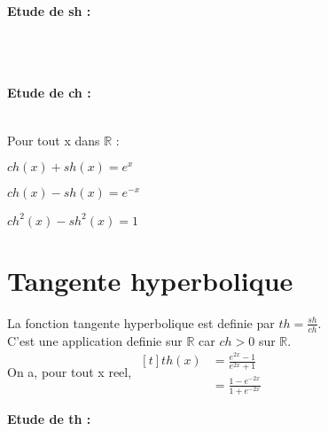\documentclass[12pt,twoside,a4paper]{article}
\begin{document}
			\textbf{Etude de sh :}\\ \ \\
			\\ \ \\
			\textbf{Etude de ch :}\\ \ \\
			\begin{prop}
				Pour tout x dans $\mathbb{R}$ :
				\begin{liste}
					\item $ch\left(x\right)+sh\left(x\right)=e^x$
					\item $ch\left(x\right)-sh\left(x\right)=e^{-x}$
					\item $ch^2\left(x\right)-sh^2\left(x\right)=1$
				\end{liste}
			\end{prop}\newpage
	
	\section{Tangente hyperbolique}
		\begin{defi}
			La fonction tangente hyperbolique est definie par $th=\frac{sh}{ch}$.\\
			C'est une application definie sur $\mathbb{R}$ car $ch>0$ sur $\mathbb{R}$.\\
			On a, pour tout x reel, $\begin{aligned}[t]th\left(x\right)&=\frac{e^{2x}-1}{e^{2x}+1}\\
																		 &=\frac{1-e^{-2x}}{1+e^{-2x}}\end{aligned}$
		\end{defi}
		\textbf{Etude de th :}\\ \ \\
\end{document}
